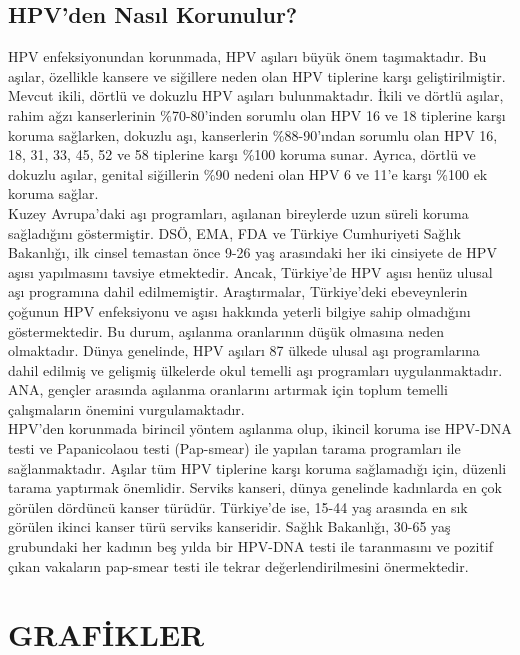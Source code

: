\documentclass[turkish]{article}
\begin{document}
\subsection{HPV'den Nasıl Korunulur?}
HPV enfeksiyonundan korunmada, HPV aşıları büyük önem taşımaktadır. Bu aşılar, özellikle kansere ve siğillere neden olan HPV tiplerine karşı geliştirilmiştir. Mevcut ikili, dörtlü ve dokuzlu HPV aşıları bulunmaktadır. İkili ve dörtlü aşılar, rahim ağzı kanserlerinin \%70-80’inden sorumlu olan HPV 16 ve 18 tiplerine karşı koruma sağlarken, dokuzlu aşı, kanserlerin \%88-90’ından sorumlu olan HPV 16, 18, 31, 33, 45, 52 ve 58 tiplerine karşı \%100 koruma sunar. Ayrıca, dörtlü ve dokuzlu aşılar, genital siğillerin \%90 nedeni olan HPV 6 ve 11’e karşı \%100 ek koruma sağlar.
\\Kuzey Avrupa’daki aşı programları, aşılanan bireylerde uzun süreli koruma sağladığını göstermiştir. DSÖ, EMA, FDA ve Türkiye Cumhuriyeti Sağlık Bakanlığı, ilk cinsel temastan önce 9-26 yaş arasındaki her iki cinsiyete de HPV aşısı yapılmasını tavsiye etmektedir. Ancak, Türkiye’de HPV aşısı henüz ulusal aşı programına dahil edilmemiştir. Araştırmalar, Türkiye’deki ebeveynlerin çoğunun HPV enfeksiyonu ve aşısı hakkında yeterli bilgiye sahip olmadığını göstermektedir. Bu durum, aşılanma oranlarının düşük olmasına neden olmaktadır. Dünya genelinde, HPV aşıları 87 ülkede ulusal aşı programlarına dahil edilmiş ve gelişmiş ülkelerde okul temelli aşı programları uygulanmaktadır. ANA, gençler arasında aşılanma oranlarını artırmak için toplum temelli çalışmaların önemini vurgulamaktadır.
\\HPV’den korunmada birincil yöntem aşılanma olup, ikincil koruma ise HPV-DNA testi ve Papanicolaou testi (Pap-smear) ile yapılan tarama programları ile sağlanmaktadır. Aşılar tüm HPV tiplerine karşı koruma sağlamadığı için, düzenli tarama yaptırmak önemlidir. Serviks kanseri, dünya genelinde kadınlarda en çok görülen dördüncü kanser türüdür. Türkiye’de ise, 15-44 yaş arasında en sık görülen ikinci kanser türü serviks kanseridir. Sağlık Bakanlığı, 30-65 yaş grubundaki her kadının beş yılda bir HPV-DNA testi ile taranmasını ve pozitif çıkan vakaların pap-smear testi ile tekrar değerlendirilmesini önermektedir.
 
\hspace{}
\hspace{}
\hspace{}

\section{GRAFİKLER}
\end{document}
